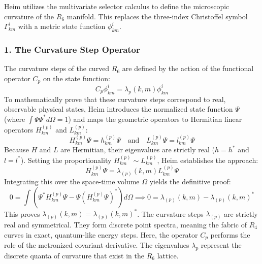 \documentclass[11pt,a4paper,oneside]{article}
\begin{document}
Heim utilizes the multivariate selector calculus to define the microscopic curvature of the $R_6$ manifold. This replaces the three-index Christoffel symbol $\Gamma^i_{km}$ with a metric state function $\phi^i_{km}$.

\subsubsection*{1. The Curvature Step Operator}
The curvature steps of the curved $R_6$ are defined by the action of the functional operator $C_p$ on the state function:
\begin{equation}
    C_p \phi^i_{km} = \lambda_p(k, m) \phi^i_{km} \tag{II-1.3}
\end{equation}
To mathematically prove that these curvature steps correspond to real, observable physical states, Heim introduces the normalized state function $\Psi$ (where $\int \Psi\Psi^* d\Omega = 1$) and maps the geometric operators to Hermitian linear operators $H_{km}^{(p)}$ and $L_{km}^{(p)}$:
\begin{equation}
    H_{km}^{(p)}\Psi = h_{km}^{(p)}\Psi \quad \text{and} \quad L_{km}^{(p)}\Psi = l_{km}^{(p)}\Psi
\end{equation}
Because $H$ and $L$ are Hermitian, their eigenvalues are strictly real ($h = h^*$ and $l = l^*$). Setting the proportionality $H_{km}^{(p)} \sim L_{km}^{(p)}$, Heim establishes the approach:
\begin{equation}
    H_{km}^{(p)}\Psi = \lambda_{(p)}(k,m)L_{km}^{(p)}\Psi
\end{equation}
Integrating this over the space-time volume $\Omega$ yields the definitive proof:
\begin{equation}
    0 = \int \left( \Psi^* H_{km}^{(p)}\Psi - \Psi(H_{km}^{(p)}\Psi)^* \right) d\Omega \implies 0 = \lambda_{(p)}(k,m) - \lambda_{(p)}(k,m)^*
\end{equation}
This proves $\lambda_{(p)}(k,m) = \lambda_{(p)}(k,m)^*$. The curvature steps $\lambda_{(p)}$ are strictly real and symmetrical. They form discrete point spectra, meaning the fabric of $R_4$ curves in exact, quantum-like energy steps.
Here, the operator $C_p$ performs the role of the metronized covariant derivative. The eigenvalues $\lambda_p$ represent the discrete quanta of curvature that exist in the $R_6$ lattice. 
\end{document}
